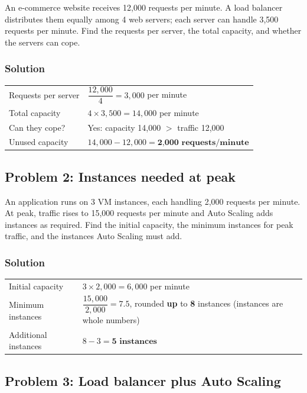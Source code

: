\documentclass[11pt,a4paper]{article}
\begin{document}
An e-commerce website receives 12,000 requests per minute. A load balancer distributes them
equally among 4 web servers; each server can handle 3,500 requests per minute. Find the
requests per server, the total capacity, and whether the servers can cope.

\subsubsection*{Solution}

\begin{tabularx}{\textwidth}{@{}lX@{}}
Requests per server & $\dfrac{12{,}000}{4} = 3{,}000$ per minute \\[8pt]
Total capacity & $4 \times 3{,}500 = 14{,}000$ per minute \\
Can they cope? & Yes: capacity 14,000 $>$ traffic 12,000 \\
Unused capacity & $14{,}000 - 12{,}000 = \textbf{2,000 requests/minute}$ \\
\end{tabularx}

\subsection*{Problem 2: Instances needed at peak}

An application runs on 3 VM instances, each handling 2,000 requests per minute. At peak,
traffic rises to 15,000 requests per minute and Auto Scaling adds instances as required. Find
the initial capacity, the minimum instances for peak traffic, and the instances Auto Scaling
must add.

\subsubsection*{Solution}

\begin{tabularx}{\textwidth}{@{}lX@{}}
Initial capacity & $3 \times 2{,}000 = 6{,}000$ per minute \\
Minimum instances & $\dfrac{15{,}000}{2{,}000} = 7.5$, rounded \textbf{up} to \textbf{8}
  instances (instances are whole numbers) \\[8pt]
Additional instances & $8 - 3 = \textbf{5 instances}$ \\
\end{tabularx}

\subsection*{Problem 3: Load balancer plus Auto Scaling}
\end{document}
